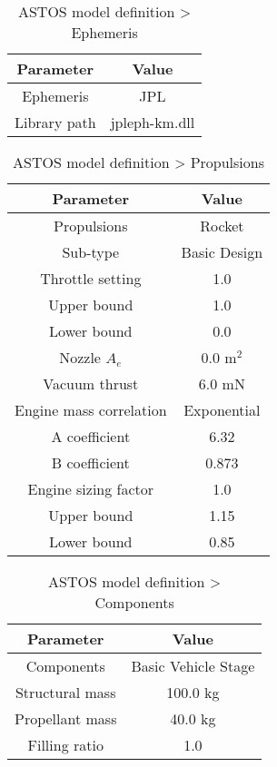 \begin{table}
\caption{ASTOS model definition > Ephemeris}
\label{tab: ASTOS-model-definition>ephemeris}
\begin{center}
\begin{tabular}{|cc|}
\hline
Parameter & Value\\
\hline
\hline
Ephemeris & JPL\\
Library path & jpleph-km.dll\\
\hline
\end{tabular}
\end{center}
\end{table}

\begin{table}
\caption{ASTOS model definition > Propulsions}
\label{tab: ASTOS-model-definition>propulsions}
\begin{center}
\begin{tabular}{|cc|}
\hline
Parameter & Value\\
\hline
\hline
Propulsions & Rocket\\
Sub-type & Basic Design\\
Throttle setting & 1.0\\
Upper bound & 1.0\\
Lower bound & 0.0\\
Nozzle \(A_{e}\) & 0.0 \(\text{m}^{2}\) \\
Vacuum thrust & 6.0 \(\text{mN}\) \\
Engine mass correlation & Exponential\\
A coefficient & 6.32\\
B coefficient & 0.873\\
Engine sizing factor & 1.0\\
Upper bound & 1.15\\
Lower bound & 0.85\\
\hline
\end{tabular}
\end{center}
\end{table}

\begin{table}
\caption{ASTOS model definition > Components}
\label{tab: ASTOS-model-definition>components}
\begin{center}
\begin{tabular}{|cc|}
\hline
Parameter & Value\\
\hline
\hline
Components & Basic Vehicle Stage\\
Structural mass & 100.0 kg\\
Propellant mass & 40.0 kg\\
Filling ratio & 1.0\\
\hline
\end{tabular}
\end{center}
\end{table}

